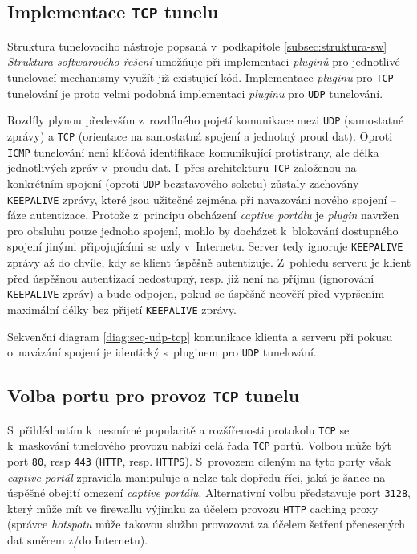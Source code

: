 \documentclass[thesis=M,czech]{FITthesis}[2012/10/20]
\begin{document}
    
    \subsection{Implementace \texttt{TCP} tunelu}
    
    Struktura tunelovacího nástroje popsaná v~podkapitole \ref{subsec:struktura-sw} \textit{Struktura softwarového řešení} umožňuje při implementaci \textit{pluginů} pro jednotlivé tunelovací mechanismy využít již existující kód. Implementace \textit{pluginu} pro \texttt{TCP} tunelování je proto velmi podobná implementaci \textit{pluginu} pro \texttt{UDP} tunelování.
    
    Rozdíly plynou především z~rozdílného pojetí komunikace mezi \texttt{UDP} (samostatné zprávy) a \texttt{TCP} (orientace na samostatná spojení a jednotný proud dat). Oproti \texttt{ICMP} tunelování není klíčová identifikace komunikující protistrany, ale délka jednotlivých zpráv v~proudu dat. I~přes architekturu \texttt{TCP} založenou na konkrétním spojení (oproti \texttt{UDP} bezstavového soketu) zůstaly zachovány \texttt{KEEPALIVE} zprávy, které jsou užitečné zejména při navazování nového spojení -- fáze autentizace. Protože z~principu obcházení \textit{captive portálu} je \textit{plugin} navržen pro obsluhu pouze jednoho spojení, mohlo by docházet k~blokování dostupného spojení jinými připojujícími se uzly v~Internetu. Server tedy ignoruje \texttt{KEEPALIVE} zprávy až do chvíle, kdy se klient úspěšně autentizuje. Z~pohledu serveru je klient před úspěšnou autentizací nedostupný, resp. již není na příjmu (ignorování \texttt{KEEPALIVE} zpráv) a bude odpojen, pokud se úspěšně neověří před vypršením maximální délky bez přijetí \texttt{KEEPALIVE} zprávy.
    
    Sekvenční diagram \ref{diag:seq-udp-tcp} komunikace klienta a serveru při pokusu o~navázání spojení je identický s~pluginem pro \texttt{UDP} tunelování.
    
    \subsection{Volba portu pro provoz \texttt{TCP} tunelu}
    
    S~přihlédnutím k~nesmírné popularitě a rozšířenosti protokolu \texttt{TCP} se k~maskování tunelového provozu nabízí celá řada \texttt{TCP} portů. Volbou může být port \texttt{80}, resp \texttt{443} (\texttt{HTTP}, resp. \texttt{HTTPS}). S~provozem cíleným na tyto porty však \textit{captive portál} zpravidla manipuluje a nelze tak dopředu říci, jaká je šance na úspěšné obejití omezení \textit{captive portálu}. Alternativní volbu představuje port \texttt{3128}, který může mít ve firewallu výjimku za účelem provozu \texttt{HTTP} caching proxy (správce \textit{hotspotu} může takovou službu provozovat za účelem šetření přenesených dat směrem z/do Internetu).
    
\end{document}
